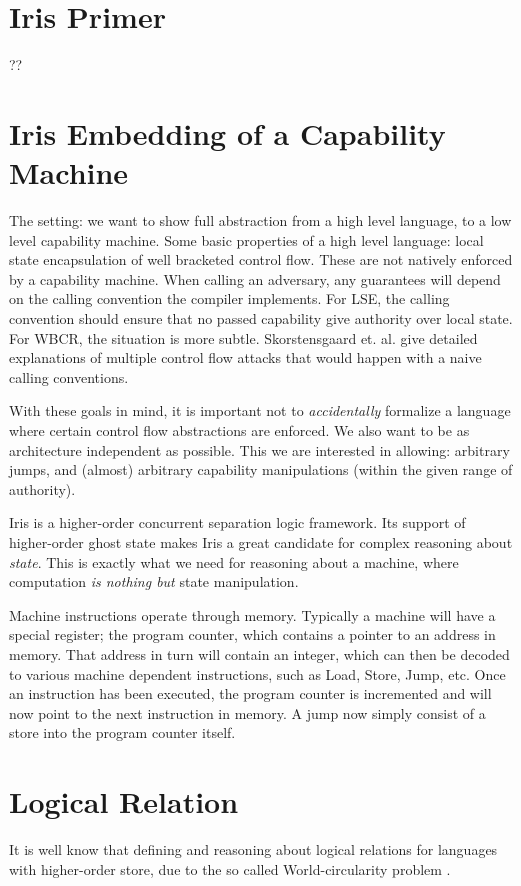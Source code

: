 \documentclass[sigplan,review,anonymous]{acmart}\settopmatter{printfolios=true,printccs=false,printacmref=false}
\begin{document}
\section{Iris Primer}
??

\section{Iris Embedding of a Capability Machine}
The setting: we want to show full abstraction from a high level language, to a low level capability machine. Some basic properties of a high level language: local state encapsulation of well bracketed control flow. These are not natively enforced by a capability machine. When calling an adversary, any guarantees will depend on the calling convention the compiler implements. For LSE, the calling convention should ensure that no passed capability give authority over local state. For WBCR, the situation is more subtle. Skorstensgaard et. al. give detailed explanations of multiple control flow attacks that would happen with a naive calling conventions. 

With these goals in mind, it is important not to \textit{accidentally} formalize a language where certain control flow abstractions are enforced. We also want to be as architecture independent as possible. This we are interested in allowing: arbitrary jumps, and (almost) arbitrary capability manipulations (within the given range of authority). 

Iris is a higher-order concurrent separation logic framework. Its support of higher-order ghost state makes Iris a great candidate for complex reasoning about \textit{state}. This is exactly what we need for reasoning about a machine, where computation \textit{is nothing but} state manipulation. 

Machine instructions operate through memory. Typically a machine will have a special register; the program counter, which contains a pointer to an address in memory. That address in turn will contain an integer, which can then be decoded to various machine dependent instructions, such as Load, Store, Jump, etc. Once an instruction has been executed, the program counter is incremented and will now point to the next instruction in memory. A jump now simply consist of a store into the program counter itself. 

\section{Logical Relation}
It is well know that defining and reasoning about logical relations for languages with higher-order store, due to the so called World-circularity problem \cite{amal}. 
\end{document}
